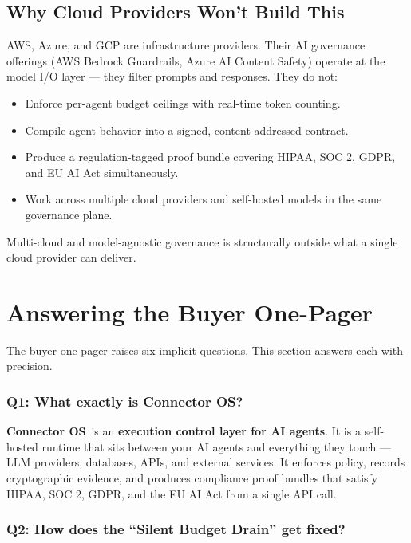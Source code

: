 \documentclass[11pt,a4paper]{article}
\newcommand{\connector}{\textbf{Connector OS}}
\begin{document}
\subsection{Why Cloud Providers Won't Build This}

AWS, Azure, and GCP are infrastructure providers. Their AI governance offerings (AWS Bedrock Guardrails,
Azure AI Content Safety) operate at the model I/O layer — they filter prompts and responses.
They do not:

\begin{itemize}
  \item Enforce per-agent budget ceilings with real-time token counting.
  \item Compile agent behavior into a signed, content-addressed contract.
  \item Produce a regulation-tagged proof bundle covering HIPAA, SOC 2, GDPR, and EU AI Act simultaneously.
  \item Work across multiple cloud providers and self-hosted models in the same governance plane.
\end{itemize}

Multi-cloud and model-agnostic governance is structurally outside what a single cloud provider can deliver.

\clearpage

\section{Answering the Buyer One-Pager}
\label{sec:buyer-answers}

The buyer one-pager raises six implicit questions. This section answers each with precision.

\subsubsection*{Q1: What exactly is Connector OS?}

\connector\ is an \textbf{execution control layer for AI agents}. It is a self-hosted runtime that
sits between your AI agents and everything they touch — LLM providers, databases, APIs, and external
services. It enforces policy, records cryptographic evidence, and produces compliance proof bundles
that satisfy HIPAA, SOC 2, GDPR, and the EU AI Act from a single API call.

\subsubsection*{Q2: How does the ``Silent Budget Drain'' get fixed?}
\end{document}
